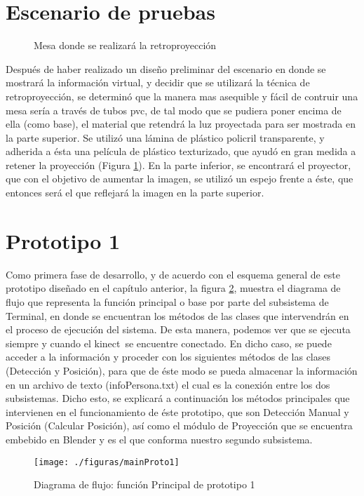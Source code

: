 \documentclass[a4paper,openright,12pt]{report}
\begin{document}
\section{Escenario de pruebas}
\begin{figure}[ht]
	\centering
	\hspace{-2mm}
	\hspace*{10mm}
	\caption{Mesa donde se realizará la retroproyección} \label{fig:mesa}
\end{figure}
Después de haber realizado un diseño preliminar del escenario en donde se mostrará la información virtual, y decidir que se utilizará la técnica de retroproyección, se determinó que la manera mas asequible y fácil de contruir una mesa sería a través de tubos pvc, de tal modo que se pudiera poner encima de ella (como base), el material que retendrá la luz proyectada para ser mostrada en la parte superior. Se utilizó una lámina de plástico policril transparente, y adherida a ésta una película de plástico texturizado, que ayudó en gran medida a retener la proyección (Figura \ref{fig:mesa}). En la parte inferior, se encontrará el proyector, que con el objetivo de aumentar la imagen, se utilizó un espejo frente a éste, que entonces será el que reflejará la imagen en la parte superior.


\section{Prototipo 1}
Como primera fase de desarrollo, y de acuerdo con el esquema general de este prototipo diseñado en el capítulo anterior, la figura \ref{fig:mainProto1}, muestra el diagrama de flujo que representa la función principal o base por parte del subsistema de Terminal, en donde se encuentran los métodos de las clases que intervendrán en el proceso de ejecución del sistema. De esta manera, podemos ver que se ejecuta siempre y cuando el kinect\textcopyright\ se encuentre conectado. En dicho caso, se puede acceder a la información y proceder con los siguientes métodos de las clases (Detección y Posición), para que de éste modo se pueda almacenar la información en un archivo de texto (infoPersona.txt) el cual es la conexión entre los dos subsistemas. Dicho esto, se explicará a continuación los métodos principales que intervienen en el funcionamiento de éste prototipo, que son Detección Manual y Posición (Calcular Posición), así como el módulo de Proyección que se encuentra embebido en Blender y es el que conforma nuestro segundo subsistema.
\begin{figure}[ht]
	\centering
	\texttt{[image: ./figuras/mainProto1]}
	\caption{Diagrama de flujo: función Principal de prototipo 1} \label{fig:mainProto1}
\end{figure}
\end{document}
